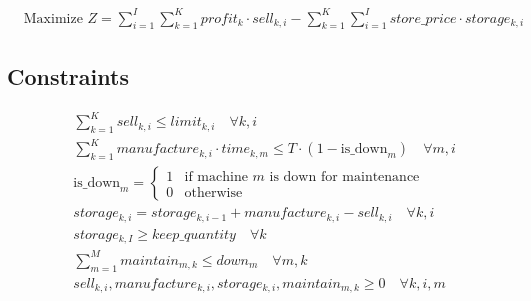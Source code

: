 \documentclass{article}
\begin{document}
\begin{align*}
& \text{Maximize } Z = \sum_{i=1}^{I} \sum_{k=1}^{K} profit_k \cdot sell_{k, i} - \sum_{k=1}^{K} \sum_{i=1}^{I} store\_price \cdot storage_{k, i}
\end{align*}

\subsection*{Constraints}

\begin{align*}
& \sum_{k=1}^{K} sell_{k, i} \leq limit_{k, i} \quad \forall k, i \\
& \sum_{k=1}^{K} manufacture_{k, i} \cdot time_{k, m} \leq T \cdot (1 - \text{is\_down}_m) \quad \forall m, i \\
& \text{is\_down}_m = 
\begin{cases} 
1 & \text{if machine } m \text{ is down for maintenance} \\
0 & \text{otherwise}
\end{cases} \\
& storage_{k, i} = storage_{k, i-1} + manufacture_{k, i} - sell_{k, i} \quad \forall k, i \\
& storage_{k, I} \geq keep\_quantity \quad \forall k \\
& \sum_{m=1}^{M} maintain_{m, k} \leq down_m \quad \forall m, k \\
& sell_{k, i}, manufacture_{k, i}, storage_{k, i}, maintain_{m, k} \geq 0 \quad \forall k, i, m
\end{align*}
\end{document}
